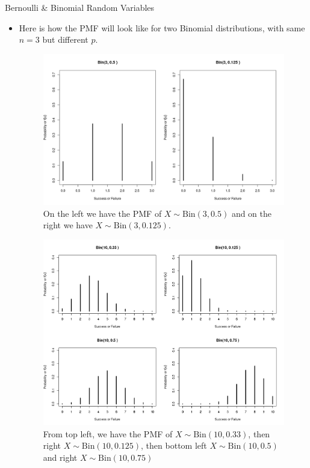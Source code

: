 \documentclass[8pt, usepdftitle = false]{beamer}
\begin{document}
\begin{frame}[allowframebreaks]{Bernoulli \& Binomial Random Variables}
\begin{itemize}
Then \emph{we get $\mathbb{E}(X) = np$, similarly we can derive the variance is $\mathbb{V}\mathrm{ar}(X) = np(1-p)$ (I am skipping the proof). Again the easy trick is to apply Binomial - Bernoulli relation}.


\item Here is how the PMF will look like for two Binomial distributions, with same $n = 3$ but different $p$.

\begin{figure}
\includegraphics[scale = .3]{Images/Binomial-1.png}
\caption{On the left we have the PMF of $X \sim \textrm{Bin}(3, 0.5)$ and on the right we have $X \sim \textrm{Bin}(3, 0.125)$.  }
\end{figure}



\begin{figure}
\includegraphics[scale = .3]{Images/Binomial-2.png}
\caption{From top left, we have the PMF of $X \sim \textrm{Bin}(10, 0.33)$, then right $X \sim \textrm{Bin}(10, 0.125)$, then bottom left $X \sim \textrm{Bin}(10, 0.5)$ and right $X \sim \textrm{Bin}(10, 0.75)$  }
\end{figure}



\end{itemize}
\end{frame}
\end{document}
